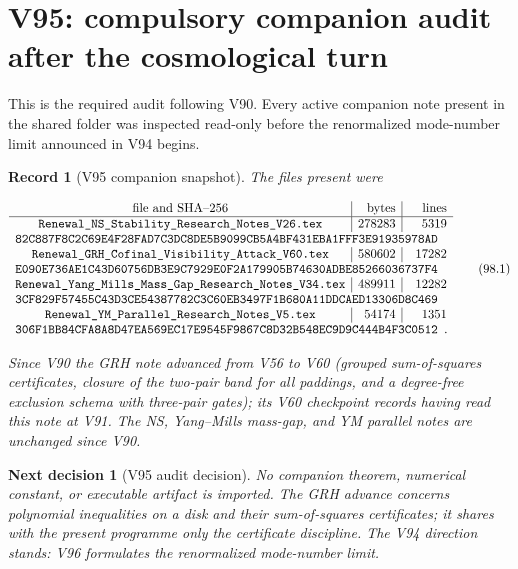 \documentclass[11pt]{article}
\newtheorem{decision}[theorem]{Next decision}
\newtheorem{record}[theorem]{Record}
\theoremstyle{remark}
\begin{document}
\section{V95: compulsory companion audit after the cosmological turn}
\label{sec:v19v95}

This is the required audit following V90.  Every active companion
note present in the shared folder was inspected read-only before the
renormalized mode-number limit announced in V94 begins.

\begin{record}[V95 companion snapshot]
\label{rec:v19v95-snapshot}
The files present were

\[
\begin{array}{c|r|r}
\hbox{file and SHA--256}&\hbox{bytes}&\hbox{lines}\\ \hline
\texttt{Renewal\_NS\_Stability\_Research\_Notes\_V26.tex}
&278283&5319\\
\multicolumn{3}{l}{
\texttt{82C887F8C2C69E4F28FAD7C3DC8DE5B9099CB5A4BF431EBA1FFF3E91935978AD}}
\\
\texttt{Renewal\_GRH\_Cofinal\_Visibility\_Attack\_V60.tex}
&580602&17282\\
\multicolumn{3}{l}{
\texttt{E090E736AE1C43D60756DB3E9C7929E0F2A179905B74630ADBE85266036737F4}}
\\
\texttt{Renewal\_Yang\_Mills\_Mass\_Gap\_Research\_Notes\_V34.tex}
&489911&12282\\
\multicolumn{3}{l}{
\texttt{3CF829F57455C43D3CE54387782C3C60EB3497F1B680A11DDCAED13306D8C469}}
\\
\texttt{Renewal\_YM\_Parallel\_Research\_Notes\_V5.tex}
&54174&1351\\
\multicolumn{3}{l}{
\texttt{306F1BB84CFA8A8D47EA569EC17E9545F9867C8D32B548EC9D9C444B4F3C0512}}.
\end{array}                                                     \tag{98.1}
\]

Since V90 the GRH note advanced from V56 to V60 (grouped
sum-of-squares certificates, closure of the two-pair band for all
paddings, and a degree-free exclusion schema with three-pair gates);
its V60 checkpoint records having read this note at V91.  The NS,
Yang--Mills mass-gap, and YM parallel notes are unchanged since V90.
\end{record}

\begin{decision}[V95 audit decision]
\label{dec:v19v95-audit}
No companion theorem, numerical constant, or executable artifact is
imported.  The GRH advance concerns polynomial inequalities on a
disk and their sum-of-squares certificates; it shares with the
present programme only the certificate discipline.  The V94 direction
stands: V96 formulates the renormalized mode-number limit.
\end{decision}
\end{document}
